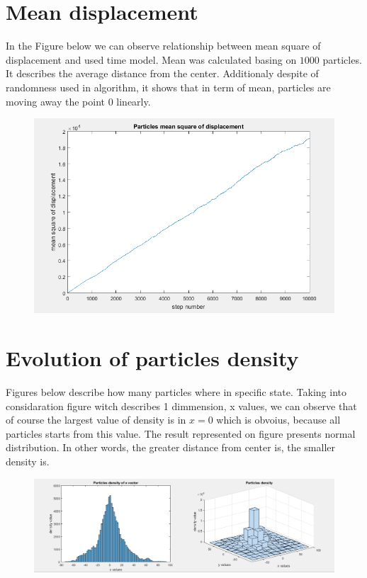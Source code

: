 \documentclass[a4paper,12pt]{article}
\begin{document}
\section{Mean displacement}
In the Figure below we can observe relationship between mean square of displacement and used time  model. Mean was calculated basing on $1000$ particles. It describes the average distance from the center. Additionaly despite of randomness used in algorithm, it shows that in term of mean, particles are moving away the point 0 linearly.
\begin{figure}[H]
\includegraphics[scale=0.6]{mean-square}
\centering
\end{figure}

\section{Evolution of particles density}
Figures below describe how many particles where in specific state. Taking into considaration figure witch describes 1 dimmension, x values, we can observe that of course the largest value of density is in $x=0$ which is obvoius, because all particles starts from this value. The result represented on figure presents normal distribution. In other words, the greater distance from center is, the smaller density is.
\begin{figure}[H]
\includegraphics[scale=0.5]{density}
\centering
\end{figure}
\end{document}
